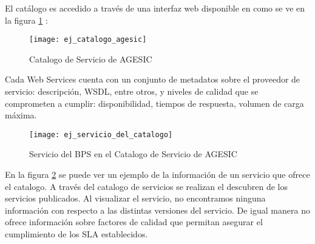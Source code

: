 El catálogo es accedido a través de una interfaz web disponible en \cite{Agesic:Catalogo} como se ve en la figura \ref{figura:ej_catalogo_agesic} :
      \begin{figure}[h]
        \centering
        \texttt{[image: ej\_catalogo\_agesic]}
        \caption{Catalogo de Servicio de AGESIC}
        \label{figura:ej_catalogo_agesic}
      \end{figure}
Cada Web Services cuenta con un conjunto de metadatos sobre el proveedor de servicio: descripción, WSDL, entre otros, y niveles de calidad que se comprometen a cumplir: disponibilidad, tiempos de respuesta, volumen de carga máxima.
      \begin{figure}[h]
        \centering
        \texttt{[image: ej\_servicio\_del\_catalogo]}
        \caption{Servicio del BPS en el Catalogo de Servicio de AGESIC}
        \label{figura:ej_servicio_del_catalogo}
      \end{figure}
En la figura \ref{figura:ej_servicio_del_catalogo} se puede ver un ejemplo de la información de un servicio que ofrece el catalogo.
A través del catalogo de servicios se realizan el descubren de los servicios publicados. Al visualizar el servicio, no encontramos ninguna información con respecto a las distintas versiones del servicio. De igual manera no ofrece información sobre factores de calidad que permitan asegurar el cumplimiento de los SLA establecidos.

